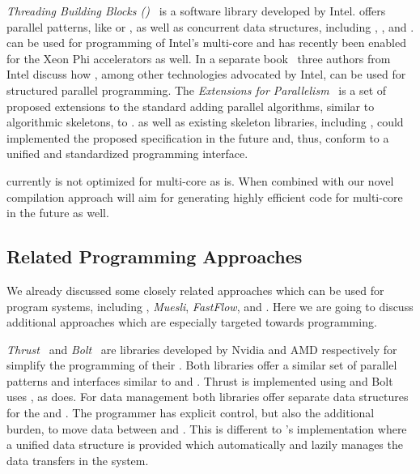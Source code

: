 \bigskip

\emph{Threading Building Blocks (\TBB)}~\cite{Reinders2007} is a software library developed by Intel.
\TBB offers parallel patterns, like  or , as well as concurrent data structures, including , , and .
\TBB can be used for programming of Intel's multi-core \CPUs and has recently been enabled for the Xeon Phi accelerators as well.
In a separate book~\cite{McCoolRoRe2012} three authors from Intel discuss how \TBB, among other technologies advocated by Intel, can be used for structured parallel programming.
The \emph{\Cpp Extensions for Parallelism}~\cite{CppParallelism} is a set of proposed extensions to the \Cpp standard adding parallel algorithms, similar to algorithmic skeletons, to \Cpp.
\TBB as well as existing skeleton libraries, including \SkelCL, could implemented the proposed specification in the future and, thus, conform to a unified and standardized programming interface.

\SkelCL currently is not optimized for multi-core \CPUs as \TBB is.
When combined with our novel compilation approach \SkelCL will aim for generating highly efficient code for multi-core \CPUs in the future as well.

\subsection{Related \GPU Programming Approaches}
We already discussed some closely related approaches which can be used for program \GPU systems, including \emph{\SkePU}, \emph{Muesli}, \emph{FastFlow}, and \emph{\JPAI}.
Here we are going to discuss additional approaches which are especially targeted towards \GPU programming.

\bigskip

\emph{Thrust}~\cite{BellHo2011} and \emph{Bolt}~\cite{Thrust} are \Cpp libraries developed by Nvidia and AMD respectively for simplify the programming of their \GPUs.
Both libraries offer a similar set of parallel patterns and interfaces similar to \TBB and \SkelCL.
Thrust is implemented using \CUDA and Bolt uses \OpenCL, as \SkelCL does.
For data management both libraries offer separate data structures for the \CPU and \GPU.
The programmer has explicit control, but also the additional burden, to move data between \CPU and \GPU.
This is different to \SkelCL's implementation where a unified data structure is provided which automatically and lazily manages the data transfers in the system.

